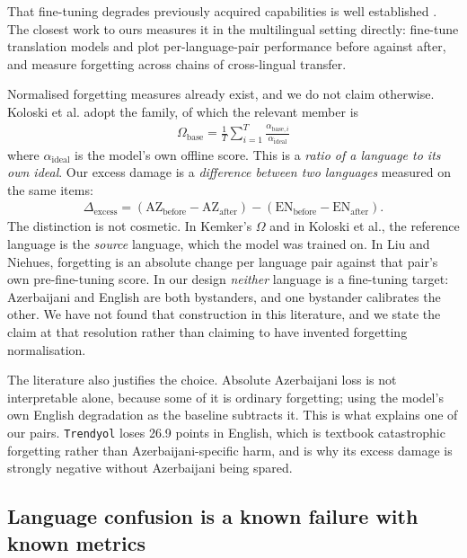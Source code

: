 \documentclass[final]{clv2025}
\begin{document}
That fine-tuning degrades previously acquired capabilities is well established
\cite{mccloskey1989catastrophic,kemker2018measuring,luo2023empirical}. The
closest work to ours measures it in the multilingual setting directly:
 fine-tune translation models and plot
per-language-pair performance before against after, and
 measure forgetting across chains of
cross-lingual transfer.

Normalised forgetting measures already exist, and we do not claim otherwise.
Koloski et al. adopt the  family, of which the
relevant member is
%
\begin{align}
\Omega_{\mathrm{base}} = \frac{1}{T}\sum_{i=1}^{T}
    \frac{\alpha_{\mathrm{base},i}}{\alpha_{\mathrm{ideal}}}
\end{align}
%
where $\alpha_{\mathrm{ideal}}$ is the model's own offline score. This is a
\emph{ratio of a language to its own ideal}. Our excess damage is a
\emph{difference between two languages} measured on the same items:
%
\begin{align}
\Delta_{\mathrm{excess}} =
    (\mathrm{AZ}_{\mathrm{before}} - \mathrm{AZ}_{\mathrm{after}}) -
    (\mathrm{EN}_{\mathrm{before}} - \mathrm{EN}_{\mathrm{after}}).
\end{align}
%
The distinction is not cosmetic. In Kemker's $\Omega$ and in Koloski et al.,
the reference language is the \emph{source} language, which the model was
trained on. In Liu and Niehues, forgetting is an absolute change per language
pair against that pair's own pre-fine-tuning score. In our design \emph{neither}
language is a fine-tuning target: Azerbaijani and English are both bystanders,
and one bystander calibrates the other. We have not found that construction in
this literature, and we state the claim at that resolution rather than claiming
to have invented forgetting normalisation.

The literature also justifies the choice. Absolute Azerbaijani loss is not
interpretable alone, because some of it is ordinary forgetting; using the
model's own English degradation as the baseline subtracts it. This is what
explains one of our pairs. \texttt{Trendyol} loses 26.9 points in English,
which is textbook catastrophic forgetting rather than Azerbaijani-specific
harm, and is why its excess damage is strongly negative without Azerbaijani
being spared.

\subsection{Language confusion is a known failure with known metrics}
\end{document}

